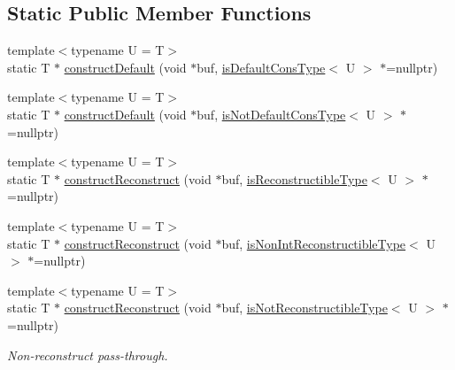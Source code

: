 \subsection*{Static Public Member Functions}
\begin{DoxyCompactItemize}
\item 
{\footnotesize template$<$typename U  = T$>$ }\\static T $\ast$ \hyperlink{structcheckpoint_1_1dispatch_1_1_reconstructor_af09a6d0312dbed7c8a311350b689794d}{construct\+Default} (void $\ast$buf, \hyperlink{structcheckpoint_1_1dispatch_1_1_reconstructor_ae91135a7a24b1008e7f184271fbc35d8}{is\+Default\+Cons\+Type}$<$ U $>$ $\ast$=nullptr)
\item 
{\footnotesize template$<$typename U  = T$>$ }\\static T $\ast$ \hyperlink{structcheckpoint_1_1dispatch_1_1_reconstructor_a74ded346aaee98f25dc498322e6e1411}{construct\+Default} (void $\ast$buf, \hyperlink{structcheckpoint_1_1dispatch_1_1_reconstructor_a0062e5edfdd87b34c3e5464d1f1020ec}{is\+Not\+Default\+Cons\+Type}$<$ U $>$ $\ast$=nullptr)
\item 
{\footnotesize template$<$typename U  = T$>$ }\\static T $\ast$ \hyperlink{structcheckpoint_1_1dispatch_1_1_reconstructor_a86a95e9ca24e30a627ed6626f19db4a2}{construct\+Reconstruct} (void $\ast$buf, \hyperlink{structcheckpoint_1_1dispatch_1_1_reconstructor_a37f3875f054a494315bf3a577346073d}{is\+Reconstructible\+Type}$<$ U $>$ $\ast$=nullptr)
\item 
{\footnotesize template$<$typename U  = T$>$ }\\static T $\ast$ \hyperlink{structcheckpoint_1_1dispatch_1_1_reconstructor_ad1362a1e66b441a04e4bb4b7245eb3c4}{construct\+Reconstruct} (void $\ast$buf, \hyperlink{structcheckpoint_1_1dispatch_1_1_reconstructor_a522861d587505c7fbe63d5a7a913b298}{is\+Non\+Int\+Reconstructible\+Type}$<$ U $>$ $\ast$=nullptr)
\item 
{\footnotesize template$<$typename U  = T$>$ }\\static T $\ast$ \hyperlink{structcheckpoint_1_1dispatch_1_1_reconstructor_a8a504054312ef8e5703d938cc2ef75be}{construct\+Reconstruct} (void $\ast$buf, \hyperlink{structcheckpoint_1_1dispatch_1_1_reconstructor_a36da09eb87ef3c1b45c0cdba27895f72}{is\+Not\+Reconstructible\+Type}$<$ U $>$ $\ast$=nullptr)
\begin{DoxyCompactList}\small\item\em Non-\/reconstruct pass-\/through. \end{DoxyCompactList}\item 

\end{DoxyCompactItemize}
